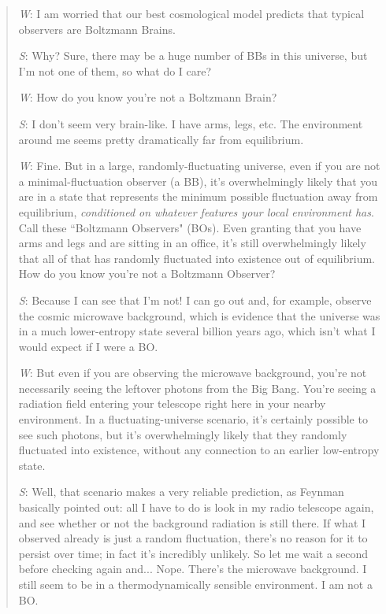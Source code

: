 \documentclass[12pt,letterpaper]{article}
\begin{document}
\begin{quotation}
\emph{W}: I am worried that our best cosmological model predicts that typical observers are Boltzmann Brains.

\emph{S}: Why? Sure, there may be a huge number of BBs in this universe, but I'm not one of them, so what do I care?

\emph{W}: How do you know you're not a Boltzmann Brain?

\emph{S}: I don't seem very brain-like. I have arms, legs, etc. The environment around me seems pretty dramatically far from equilibrium.

\emph{W}: Fine. But in a large, randomly-fluctuating universe, even if you are not a minimal-fluctuation observer (a BB), it's overwhelmingly likely that you are in a state that represents the minimum possible fluctuation away from equilibrium, \emph{conditioned on whatever features your local environment has}. Call these ``Boltzmann Observers" (BOs). Even granting that you have arms and legs and are sitting in an office, it's still overwhelmingly likely that all of that has randomly fluctuated into existence out of equilibrium. How do you know you're not a Boltzmann Observer?

\emph{S}: Because I can see that I'm not! I can go out and, for example, observe the cosmic microwave background, which is evidence that the universe was in a much lower-entropy state several billion years ago, which isn't what I would expect if I were a BO.

\emph{W}: But even if you are observing the microwave background, you're not necessarily seeing the leftover photons from the Big Bang. You're seeing a radiation field entering your telescope right here in your nearby environment. In a fluctuating-universe scenario, it's certainly possible to see such photons, but it's overwhelmingly likely that they randomly fluctuated into existence, without any connection to an earlier low-entropy state.

\emph{S}: Well, that scenario makes a very reliable prediction, as Feynman basically pointed out: all I have to do is look in my radio telescope again, and see whether or not the background radiation is still there. If what I observed already is just a random fluctuation, there's no reason for it to persist over time; in fact it's incredibly unlikely. So let me wait a second before checking again and... Nope. There's the microwave background. I still seem to be in a thermodynamically sensible environment. I am not a BO.


\end{quotation}
\end{document}
